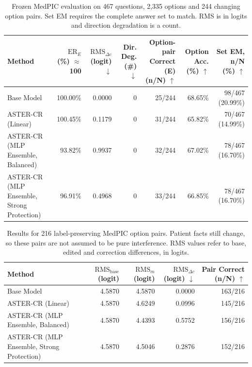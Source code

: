 \begin{table}[t]
\centering
\small
\setlength{\tabcolsep}{3pt}
\begin{tabularx}{\textwidth}{@{}>{\raggedright\arraybackslash}Xrrrrrr@{}}
\toprule
Method & \shortstack{$\mathrm{ER}_{E}$\\ (\%) $\approx$100} & \shortstack{$\mathrm{RMS}_{\Delta c}$\\ (logit) $\downarrow$} & \shortstack{Dir. Deg.\\ (\#) $\downarrow$} & \shortstack{Option-pair Correct\\ (E) (n/N) $\uparrow$} & \shortstack{Option Acc.\\ (\%) $\uparrow$} & \shortstack{Set EM, n/N\\ (\%) $\uparrow$} \\
\midrule
Base Model & 100.00\% & 0.0000 & 0 & 25/244 & 68.65\% & 98/467 (20.99\%) \\
ASTER-CR (Linear) & 100.45\% & 0.1179 & 0 & 31/244 & 65.82\% & 70/467 (14.99\%) \\
ASTER-CR (MLP Ensemble, Balanced) & 93.82\% & 0.9937 & 0 & 32/244 & 67.02\% & 78/467 (16.70\%) \\
ASTER-CR (MLP Ensemble, Strong Protection) & 96.91\% & 0.4968 & 0 & 33/244 & 66.85\% & 78/467 (16.70\%) \\
\bottomrule
\end{tabularx}
\caption{Frozen MedPIC evaluation on 467 questions, 2,335 options and 244 changing option pairs. Set EM requires the complete answer set to match. RMS is in logits and direction degradation is a count.}
\label{tab:aster-main-09}
\end{table}

\begin{table}[t]
\centering
\small
\setlength{\tabcolsep}{3pt}
\begin{tabularx}{\textwidth}{@{}>{\raggedright\arraybackslash}Xrrrr@{}}
\toprule
Method & \shortstack{$\mathrm{RMS}_{\mathrm{base}}$\\ (logit)} & \shortstack{$\mathrm{RMS}_{m}$\\ (logit)} & \shortstack{$\mathrm{RMS}_{\Delta c}$\\ (logit) $\downarrow$} & \shortstack{Pair Correct\\ (n/N) $\uparrow$} \\
\midrule
Base Model & 4.5870 & 4.5870 & 0.0000 & 163/216 \\
ASTER-CR (Linear) & 4.5870 & 4.6249 & 0.0996 & 145/216 \\
ASTER-CR (MLP Ensemble, Balanced) & 4.5870 & 4.4393 & 0.5752 & 156/216 \\
ASTER-CR (MLP Ensemble, Strong Protection) & 4.5870 & 4.5046 & 0.2876 & 152/216 \\
\bottomrule
\end{tabularx}
\caption{Results for 216 label-preserving MedPIC option pairs. Patient facts still change, so these pairs are not assumed to be pure interference. RMS values refer to base, edited and correction differences, in logits.}
\label{tab:aster-main-10}
\end{table}

